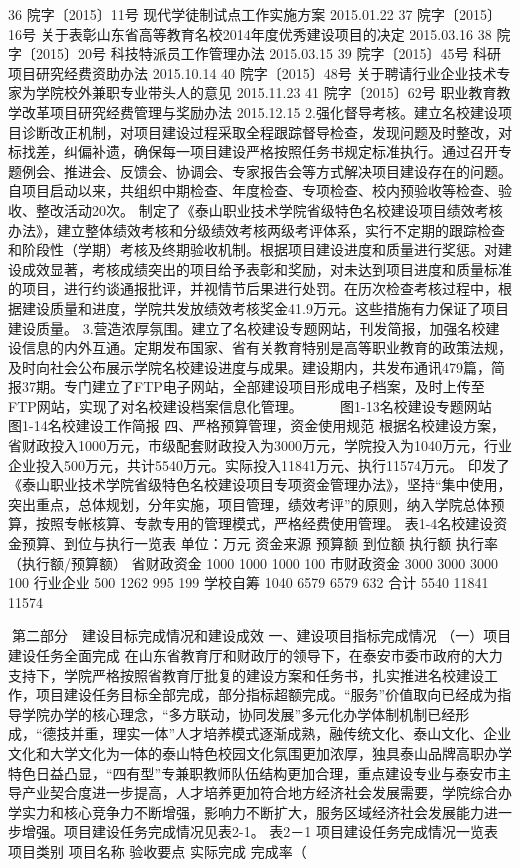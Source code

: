 36
院字〔2015〕11号
现代学徒制试点工作实施方案
2015.01.22
37
院字〔2015〕16号
关于表彰山东省高等教育名校2014年度优秀建设项目的决定
2015.03.16
38
院字〔2015〕20号
科技特派员工作管理办法
2015.03.15
39
院字〔2015〕45号
科研项目研究经费资助办法
2015.10.14
40
院字〔2015〕48号
关于聘请行业企业技术专家为学院校外兼职专业带头人的意见
2015.11.23
41
院字〔2015〕62号
职业教育教学改革项目研究经费管理与奖励办法
2015.12.15
2.强化督导考核。建立名校建设项目诊断改正机制，对项目建设过程采取全程跟踪督导检查，发现问题及时整改，对标找差，纠偏补遗，确保每一项目建设严格按照任务书规定标准执行。通过召开专题例会、推进会、反馈会、协调会、专家报告会等方式解决项目建设存在的问题。自项目启动以来，共组织中期检查、年度检查、专项检查、校内预验收等检查、验收、整改活动20次。
制定了《泰山职业技术学院省级特色名校建设项目绩效考核办法》，建立整体绩效考核和分级绩效考核两级考评体系，实行不定期的跟踪检查和阶段性（学期）考核及终期验收机制。根据项目建设进度和质量进行奖惩。对建设成效显著，考核成绩突出的项目给予表彰和奖励，对未达到项目进度和质量标准的项目，进行约谈通报批评，并视情节后果进行处罚。在历次检查考核过程中，根据建设质量和进度，学院共发放绩效考核奖金41.9万元。这些措施有力保证了项目建设质量。
3.营造浓厚氛围。建立了名校建设专题网站，刊发简报，加强名校建设信息的内外互通。定期发布国家、省有关教育特别是高等职业教育的政策法规，及时向社会公布展示学院名校建设进度与成果。建设期内，共发布通讯479篇，简报37期。专门建立了FTP电子网站，全部建设项目形成电子档案，及时上传至FTP网站，实现了对名校建设档案信息化管理。
　　 
              图1-13名校建设专题网站　　　　　  　图1-14名校建设工作简报
四、严格预算管理，资金使用规范
根据名校建设方案，省财政投入1000万元，市级配套财政投入为3000万元，学院投入为1040万元，行业企业投入500万元，共计5540万元。实际投入11841万元、执行11574万元。
印发了《泰山职业技术学院省级特色名校建设项目专项资金管理办法》，坚持“集中使用，突出重点，总体规划，分年实施，项目管理，绩效考评”的原则，纳入学院总体预算，按照专帐核算、专款专用的管理模式，严格经费使用管理。
表1-4名校建设资金预算、到位与执行一览表
单位：万元
资金来源
预算额
到位额
执行额
执行率（执行额/预算额）
省财政资金
1000
1000
1000
100%
市财政资金
3000
3000
3000
100%
行业企业
500
1262
995
199%
学校自筹
1040
6579
6579
632%
合计
5540
11841
11574

第二部分　建设目标完成情况和建设成效
一、建设项目指标完成情况
（一）项目建设任务全面完成
在山东省教育厅和财政厅的领导下，在泰安市委市政府的大力支持下，学院严格按照省教育厅批复的建设方案和任务书，扎实推进名校建设工作，项目建设任务目标全部完成，部分指标超额完成。“服务”价值取向已经成为指导学院办学的核心理念，“多方联动，协同发展”多元化办学体制机制已经形成，“德技并重，理实一体”人才培养模式逐渐成熟，融传统文化、泰山文化、企业文化和大学文化为一体的泰山特色校园文化氛围更加浓厚，独具泰山品牌高职办学特色日益凸显，“四有型”专兼职教师队伍结构更加合理，重点建设专业与泰安市主导产业契合度进一步提高，人才培养更加符合地方经济社会发展需要，学院综合办学实力和核心竞争力不断增强，影响力不断扩大，服务区域经济社会发展能力进一步增强。项目建设任务完成情况见表2-1。
表2－1 项目建设任务完成情况一览表
项目类别
项目名称
验收要点
实际完成
完成率（%




